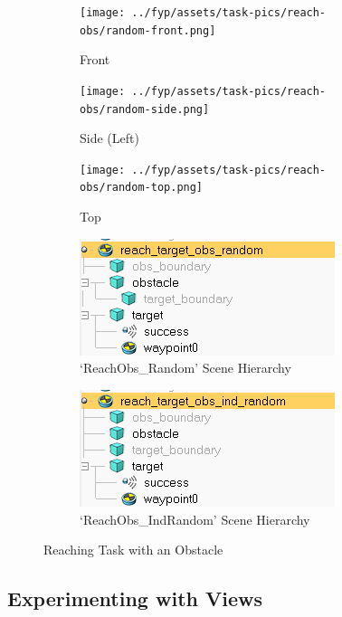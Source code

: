 \begin{figure}[htpb] %
  \centering
  \begin{subfigure}{0.3\linewidth}
    \centering
    \texttt{[image: ../fyp/assets/task-pics/reach-obs/random-front.png]}
    \caption{Front}
  \end{subfigure}
  \hfill
  \begin{subfigure}{0.3\linewidth}
    \centering
    \texttt{[image: ../fyp/assets/task-pics/reach-obs/random-side.png]}
    \caption{Side (Left)}
  \end{subfigure}
  \hfill
  \begin{subfigure}{0.3\linewidth}
    \centering
    \texttt{[image: ../fyp/assets/task-pics/reach-obs/random-top.png]}
    \caption{Top}
  \end{subfigure}
  \vfill
  \begin{subfigure}{0.45\linewidth}
    \centering
    \includegraphics[scale=0.5]{assets/early-work/obs-random-scene-hierarchy.png}
    \caption{`ReachObs\_Random' Scene Hierarchy}
  \end{subfigure}
  \hfill
  \begin{subfigure}{0.45\linewidth}
    \centering
    \includegraphics[scale=0.5]{assets/early-work/obs-ind-random-scene-hierarchy.png}
    \caption{`ReachObs\_IndRandom' Scene Hierarchy}
  \end{subfigure}
  \caption{Reaching Task with an Obstacle}\label{fig:reach-obs-random}
\end{figure} 

\subsection{Experimenting with Views}\todo[color=red]{}

